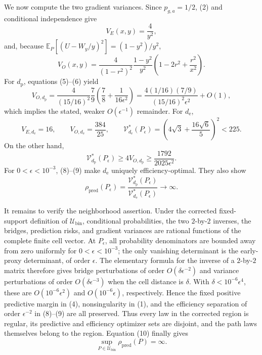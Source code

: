 We now compute the two gradient variances.  Since \(p_{g,a}=1/2\), (2) and conditional independence give
\[
 V_E(x,y)=\frac4{y^2}, \tag{5}
\]
and, because
\(\mathbb E_P[(U-W_y/y)^2]=(1-y^2)/y^2\),
\[
 V_O(x,y)=\frac4{(1-r^2)^2}\frac{1-y^2}{y^2}
 \left(1-2r^2+\frac{r^2}{x^2}\right). \tag{6}
\]
For \(d_{\mathrm p}\), equations (5)--(6) yield
\[
 V_{O,d_{\mathrm p}}
 =\frac4{(15/16)^2}\frac79
 \left(\frac78+\frac1{16\epsilon^2}\right)
 =\frac{4(1/16)(7/9)}{(15/16)^2\epsilon^2}+O(1), \tag{7}
\]
which implies the stated, weaker \(O(\epsilon^{-1})\) remainder.  For \(d_{\mathrm e}\),
\[
 V_{E,d_{\mathrm e}}=16,
 \qquad V_{O,d_{\mathrm e}}=\frac{384}{25},
 \qquad
 \mathcal V_{d_{\mathrm e}}^*(P_{\epsilon})
 =\left(4\sqrt3+\frac{16\sqrt6}{5}\right)^2<225. \tag{8}
\]
On the other hand,
\[
 \mathcal V_{d_{\mathrm p}}^*(P_{\epsilon})
 \ge4V_{O,d_{\mathrm p}}
 \ge\frac{1792}{2025\epsilon^2}. \tag{9}
\]
For \(0<\epsilon<10^{-3}\), (8)--(9) make \(d_{\mathrm e}\) uniquely efficiency-optimal.  They also show
\[
 \rho_{\mathrm{pred}}(P_{\epsilon})
 =\frac{\mathcal V_{d_{\mathrm p}}^*(P_{\epsilon})}
 {\mathcal V_{d_{\mathrm e}}^*(P_{\epsilon})}\longrightarrow\infty. \tag{10}
\]

It remains to verify the neighborhood assertion.  Under the corrected fixed-support definition of \(\mathcal U_{\mathrm{bin}}\), conditional probabilities, the two \(2\)-by-\(2\) inverses, the bridges, prediction risks, and gradient variances are rational functions of the complete finite cell vector.  At \(P_{\epsilon}\), all probability denominators are bounded away from zero uniformly for \(0<\epsilon<10^{-3}\); the only vanishing determinant is the early-proxy determinant, of order \(\epsilon\).  The elementary formula for the inverse of a \(2\)-by-\(2\) matrix therefore gives bridge perturbations of order \(O(\delta\epsilon^{-2})\) and variance perturbations of order \(O(\delta\epsilon^{-3})\) when the cell distance is \(\delta\).  With \(\delta<10^{-6}\epsilon^4\), these are \(O(10^{-6}\epsilon^2)\) and \(O(10^{-6}\epsilon)\), respectively.  Hence the fixed positive predictive margin in (4), nonsingularity in (1), and the efficiency separation of order \(\epsilon^{-2}\) in (8)--(9) are all preserved.  Thus every law in the corrected region is regular, its predictive and efficiency optimizer sets are disjoint, and the path laws themselves belong to the region.  Equation (10) finally gives
\[
 \sup_{P\in\mathcal U_{\mathrm{bin}}}\rho_{\mathrm{pred}}(P)=\infty.
\]